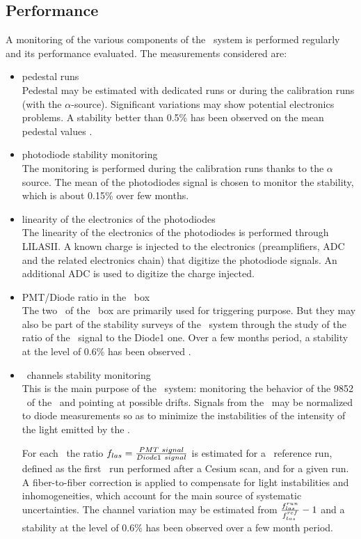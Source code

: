\subsection{Performance}
A monitoring of the various components of the \las~system is performed regularly and its performance evaluated.  The measurements considered are:
\begin{itemize}
\item{pedestal runs} \\
	
	Pedestal may be estimated with dedicated runs or during the calibration runs (with the $\alpha$-source). Significant variations may show potential electronics problems. A stability better than 0.5\% has been observed on the mean pedestal values \cite{laserb}.
\item{photodiode stability monitoring} \\
	
	The monitoring is performed during the calibration runs thanks to the $\alpha$ source. The mean of the photodiodes signal is chosen to monitor the stability, which is about 0.15\% over few months.
	
\item{linearity of the electronics of the photodiodes}\\
	
	The linearity of the electronics of the photodiodes is performed through {\sc LILASII}. A known charge is injected to the electronics (preamplifiers, ADC and the related electronics chain) that digitize the photodiode signals. An additional ADC is used to digitize the charge injected. 
\item{PMT/Diode ratio in the \las~box}\\
	
	The two \pmts~of the \las~box are primarily used for triggering purpose. But they may also be part of the stability surveys of the \las~system through the study of the ratio of the \pmts~signal to the Diode1 one. Over a few months period, a stability at the level of 0.6\% has been observed \cite{laserb}.
	
\item{\tilecal~channels stability monitoring}\\
	
	This is the main purpose of the \las~system: monitoring the behavior of the 9852 \pmts~of the \tilecal~and pointing at possible drifts. Signals from the \pmts~may be normalized to diode measurements so as to minimize the instabilities of the intensity of the light emitted by the \las.  \par
	For each \pmt~the ratio $f_{las}={{PMT~signal}\over{Diode1~signal}}$ is estimated for a \las~reference run, defined as the first \las~run performed after a Cesium scan, and for a given run. A fiber-to-fiber correction is applied to compensate for light instabilities and inhomogeneities, which account for the main source of systematic uncertainties. The channel variation may be estimated from ${{f_{las}^{run}}\over{f_{las}^{ref}}}-1$ and a stability at the level of 0.6\% has been observed over a few month period.
	
	
\end{itemize}


